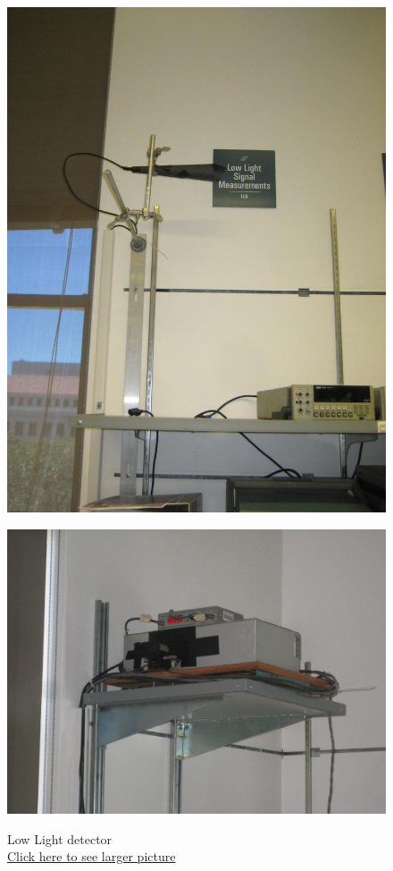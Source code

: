 \documentclass{../lab}
\begin{document}
\noindent
\begin{figure}[H]
\captionsetup{justification=centering}
  \href{http://experimentationlab.berkeley.edu/sites/default/files/IMG_4091.JPG}{\includegraphics[width=\linewidth,keepaspectratio]{images/IMG_4091.JPG}}
  \caption{Low Light detector \\ \href{http://experimentationlab.berkeley.edu/sites/default/files/IMG_4091.JPG}{Click here to see larger picture}}
  \label{fig:IMG_4091.jpg}
\endminipage\hfill
{}
  \href{http://experimentationlab.berkeley.edu/sites/default/files/images/LLS-Source_3439.jpg}{\includegraphics[width=\linewidth,keepaspectratio]{images/LLS-Source_3439.jpg}}

\end{figure}
\end{document}
